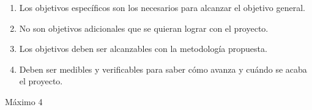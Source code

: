 \documentclass[../Main.tex]{subfiles}
\begin{document}
\begin{center}
    

\begin{enumerate}[1.]
    \item Los objetivos específicos son los necesarios para alcanzar el objetivo general.
    \item No son objetivos adicionales que se quieran lograr con el proyecto.
    \item Los objetivos deben ser alcanzables con la metodología propuesta.
    \item Deben ser medibles y verificables para saber cómo avanza y cuándo se acaba el proyecto.
\end{enumerate}
Máximo 4
\end{center}
\end{document}
